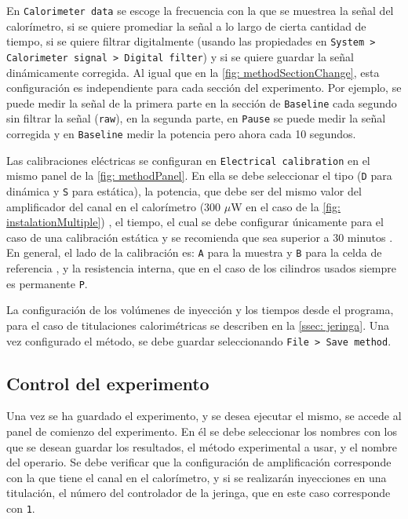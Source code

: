 	En \texttt{Calorimeter data} se escoge la frecuencia con la que se muestrea la se\~nal del calor\'imetro, si se quiere promediar la se\~nal a lo largo de cierta cantidad de tiempo, si se quiere filtrar digitalmente (usando las propiedades en \texttt{System > Calorimeter signal > Digital filter}) y si se quiere guardar la se\~nal din\'amicamente corregida. Al igual que en la \autoref{fig: methodSectionChange}, esta configuraci\'on es independiente para cada secci\'on del experimento. Por ejemplo, se puede medir la se\~nal de la primera parte en la secci\'on de \texttt{Baseline} cada segundo sin filtrar la se\~nal (\texttt{raw}), en la segunda parte, en \texttt{Pause} se puede medir la se\~nal corregida y en \texttt{Baseline} medir la potencia pero ahora cada 10 segundos.
	
	Las calibraciones el\'ectricas se configuran en \texttt{Electrical calibration} en el mismo panel de la \autoref{fig: methodPanel}. En ella se debe seleccionar el tipo (\texttt{D} para din\'amica y \texttt{S} para est\'atica), la potencia, que debe ser del mismo valor del amplificador del canal en el calor\'imetro (300 $\mu$W en el caso de la \autoref{fig: instalationMultiple}) \cite{Suurkuusk}, el tiempo, el cual se debe configurar \'unicamente para el caso de una calibraci\'on est\'atica y se recomienda que sea superior a 30 minutos \cite{Suurkuusk}. En general, el lado de la calibraci\'on es: \texttt{A} para la muestra y \texttt{B} para la celda de referencia \cite{Suurkuusk}, y la resistencia interna, que en el caso de los cilindros usados siempre es permanente \texttt{P}.
	
	La configuraci\'on de los vol\'umenes de inyecci\'on y los tiempos desde el programa, para el caso de titulaciones calorimétricas se describen en la \autoref{ssec: jeringa}. Una vez configurado el método, se debe guardar seleccionando \texttt{File > Save method}.
	
	\subsection{Control del experimento}
	Una vez se ha guardado el experimento, y se desea ejecutar el mismo, se accede al panel de comienzo del experimento. En \'el se debe seleccionar los nombres con los que se desean guardar los resultados, el m\'etodo experimental a usar, y el nombre del operario. Se debe verificar que la configuraci\'on de amplificaci\'on corresponde con la que tiene el canal en el calor\'imetro, y si se realizar\'an inyecciones en una titulaci\'on, el n\'umero del controlador de la jeringa, que en este caso corresponde con \texttt{1}.
	
